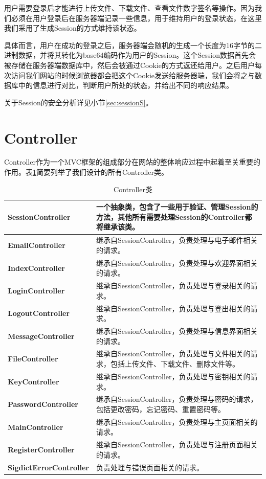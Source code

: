 用户需要登录后才能进行上传文件、下载文件、查看文件数字签名等操作。因为我们必须在用户登录后在服务器端记录一些信息，用于维持用户的登录状态，在这里我们采用了生成Session的方式维持该状态。

具体而言，用户在成功的登录之后，服务器端会随机的生成一个长度为16字节的二进制数据，并将其转化为base64编码\cite{base64}作为用户的Session。这个Session数据首先会被存储在服务器端数据库中，然后会被通过Cookie\cite{cookie}的方式返还给用户。之后用户每次访问我们网站的时候浏览器都会把这个Cookie发送给服务器端，我们会将之与数据库中的信息进行对比，判断用户所处的状态，并给出不同的响应结果。

关于Session的安全分析详见小节\ref{sec:sessionS}。

\section{Controller}\label{sec:controllerP}

Controller作为一个MVC框架的组成部分在网站的整体响应过程中起着至关重要的作用。表\ref{tab:controller}简要列举了我们设计的所有Controller类。

\begin{table}[ht]
\centering
\begin{tabular}{>{\bfseries}lp{9cm}}
\toprule
SessionController & 
一个抽象类，包含了一些用于验证、管理Session的方法，其他所有需要处理Session的Controller都将继承该类。\\
\midrule
EmailController & 
继承自SessionController，负责处理与电子邮件相关的请求。\\
\midrule
IndexController & 
继承自SessionController，负责处理与欢迎界面相关的请求。\\
\midrule
LoginController &
继承自SessionController，负责处理与登录相关的请求。\\
\midrule
LogoutController &
继承自SessionController，负责处理与登出相关的请求。\\
\midrule
MessageController &
继承自SessionController，负责处理与信息界面相关的请求。\\
\midrule
FileController &
继承自SessionController，负责处理与文件相关的请求，包括上传文件、下载文件、删除文件等。\\
\midrule
KeyController &
继承自SessionController，负责处理与密钥相关的请求。\\
\midrule
PasswordController &
继承自SessionController，负责处理与密码的请求，包括更改密码，忘记密码、重置密码等。\\
\midrule
MainController &
继承自SessionController，负责处理与主页面相关的请求。\\
\midrule
RegisterController &
继承自SessionController，负责处理与注册页面相关的请求。\\
\midrule
SigdictErrorController &
负责处理与错误页面相关的请求。\\
\bottomrule
\end{tabular}
\caption{Controller类}
\label{tab:controller}
\end{table}

